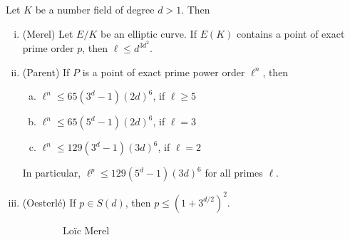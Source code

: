\begin{frame}[plain] \scriptsize
\begin{thm}
Let $K$ be a number field of degree $d > 1$. Then
	\begin{enumerate}[(i)]
	\item (Merel) Let $E/K$ be an elliptic curve. If $E(K)$ contains a point of exact prime order $p$, then $\ell \leq d^{3d^2}$.
	\item (Parent) If $P$ is a point of exact prime power order $\ell^n$, then
		\begin{enumerate}[(a)] \scriptsize
		\item $\ell^n \leq 65(3^d - 1)(2d)^6$, if $\ell \geq 5$
		\item $\ell^n \leq 65(5^d - 1)(2d)^6$, if $\ell= 3$
		\item $\ell^n \leq 129(3^d - 1)(3d)^6$, if $\ell= 2$
		\end{enumerate}
	In particular, $\ell^p \leq 129(5^d - 1)(3d)^6$ for all primes $\ell$. 
	\item (Oesterl\'e) If $p \in S(d)$, then $p \leq (1 + 3^{d/2})^2$. 
	\end{enumerate}
\end{thm}
	\begin{figure}[h]
	\centering
	\begin{subfigure}{0.3\textwidth}
	\captionsetup{labelformat=empty}
	\centering
	\caption{Lo\"ic Merel}
	\end{subfigure}
	\begin{subfigure}{0.3\textwidth}
	\captionsetup{labelformat=empty}

\end{subfigure}
\end{figure}
\end{frame}
